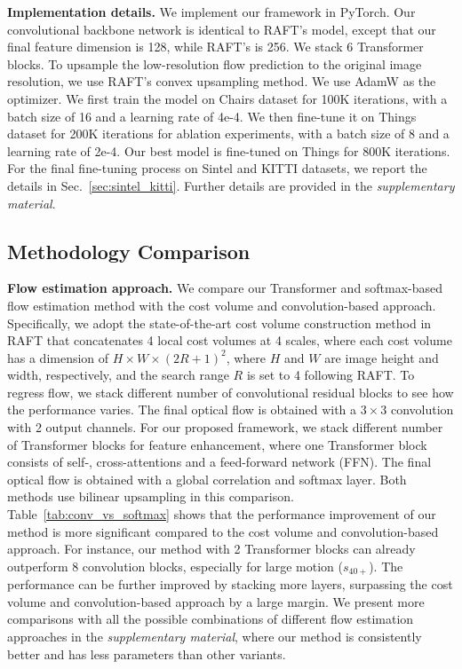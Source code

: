 \documentclass[10pt,twocolumn,letterpaper]{article}
\begin{document}
{\bf Implementation details.} We implement our framework in PyTorch. Our convolutional backbone network is identical to RAFT's model, except that our final feature dimension is 128, while RAFT's is 256. We stack 6 Transformer blocks. To upsample the low-resolution flow prediction to the original image resolution, we use RAFT's convex upsampling \cite{teed2020raft} method. We use AdamW \cite{loshchilov2017decoupled} as the optimizer. We first train the model on Chairs dataset for 100K iterations, with a batch size of 16 and a learning rate of 4e-4. We then fine-tune it on Things dataset for 200K iterations for ablation experiments, with a batch size of 8 and a learning rate of 2e-4. Our best model is fine-tuned on Things for 800K iterations. For the final fine-tuning process on Sintel and KITTI datasets, we report the details in Sec.~\ref{sec:sintel_kitti}. Further details are provided in the \emph{supplementary material}.








\subsection{Methodology Comparison}
\label{sec:method_comp}


{\bf Flow estimation approach.} We compare our Transformer and softmax-based flow estimation method with the cost volume and convolution-based approach. Specifically, we adopt the state-of-the-art cost volume construction method in RAFT \cite{teed2020raft} that concatenates 4 local cost volumes at 4 scales, where each cost volume has a dimension of $H \times W \times (2R+1)^2$, where $H$ and $W$ are image height and width, respectively, and the search range $R$ is set to 4 following RAFT. To regress flow, we stack different number of convolutional residual blocks \cite{he2016deep} to see how the performance varies. The final optical flow is obtained with a $3 \times 3$ convolution with 2 output channels. For our proposed framework, we stack different number of Transformer blocks for feature enhancement, where one Transformer block consists of self-, cross-attentions and a feed-forward network (FFN). The final optical flow is obtained with a global correlation and softmax layer. Both methods use bilinear upsampling in this comparison. Table~\ref{tab:conv_vs_softmax} shows that the performance improvement of our method is more significant compared to the cost volume and convolution-based approach. For instance, our method with 2 Transformer blocks can already outperform 8 convolution blocks, especially for large motion ($s_{40+}$). The performance can be further improved by stacking more layers, surpassing the cost volume and convolution-based approach by a large margin. We present more comparisons with all the possible combinations of different flow estimation approaches in the \emph{supplementary material}, where our method is consistently better and has less parameters than other variants.
\end{document}
